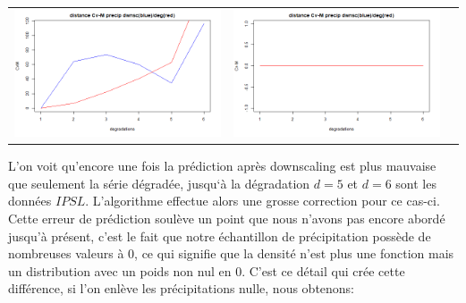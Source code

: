 \documentclass[a4paper,10pt]{article}
\begin{document}
\vspace{0.5cm}

\hspace{-1cm}
\begin{tabular}{ccc}
	\includegraphics[scale=0.4]{images/Dist_CVM_precip.png} & \includegraphics[scale=0.4]{images/Dist_CVM_evap.png}  \\
\end{tabular} 


L'on voit qu'encore une fois la prédiction après downscaling est plus mauvaise que seulement la série dégradée, jusqu`à la dégradation $d=5$ et $d=6$ sont les données $IPSL$. L'algorithme effectue alors une grosse correction pour ce cas-ci. Cette erreur de prédiction soulève un point que nous n'avons pas encore abordé jusqu'à présent, c'est le fait que notre échantillon de précipitation possède de nombreuses valeurs à $0$, ce qui signifie que la densité n'est plus une fonction mais un distribution avec un poids non nul en $0$. C'est ce détail qui crée cette différence, si l'on enlève les précipitations nulle, nous obtenons:
\end{document}
